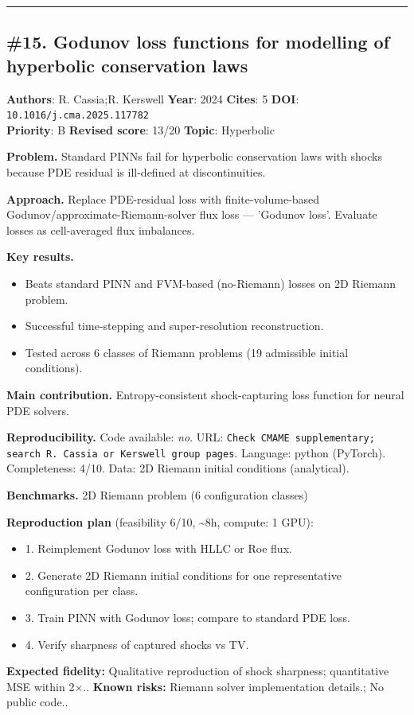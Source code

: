 \documentclass[10pt,letterpaper]{article}
\begin{document}
\medskip\hrule\medskip

\subsection*{\#15. Godunov loss functions for modelling of hyperbolic conservation laws}
\textbf{Authors}: R. Cassia;R. Kerswell \textbullet{} \textbf{Year}: 2024 \textbullet{} \textbf{Cites}: 5 \textbullet{} \textbf{DOI}: \texttt{10.1016/j.cma.2025.117782} \\
\textbf{Priority}: B \textbullet{} \textbf{Revised score}: 13/20 \textbullet{} \textbf{Topic}: Hyperbolic

\textbf{Problem.} Standard PINNs fail for hyperbolic conservation laws with shocks because PDE residual is ill-defined at discontinuities.

\textbf{Approach.} Replace PDE-residual loss with finite-volume-based Godunov/approximate-Riemann-solver flux loss — 'Godunov loss'. Evaluate losses as cell-averaged flux imbalances.

\textbf{Key results.}
\begin{itemize}
\item Beats standard PINN and FVM-based (no-Riemann) losses on 2D Riemann problem.
\item Successful time-stepping and super-resolution reconstruction.
\item Tested across 6 classes of Riemann problems (19 admissible initial conditions).
\end{itemize}

\textbf{Main contribution.} Entropy-consistent shock-capturing loss function for neural PDE solvers.

\textbf{Reproducibility.} Code available: \emph{no}. URL: \texttt{Check CMAME supplementary; search R. Cassia or Kerswell group pages}. Language: python (PyTorch). Completeness: 4/10. Data: 2D Riemann initial conditions (analytical).

\textbf{Benchmarks.} 2D Riemann problem (6 configuration classes)

\textbf{Reproduction plan} (feasibility 6/10, \textasciitilde8h, compute: 1 GPU):
\begin{itemize}
\item 1. Reimplement Godunov loss with HLLC or Roe flux.
\item 2. Generate 2D Riemann initial conditions for one representative configuration per class.
\item 3. Train PINN with Godunov loss; compare to standard PDE loss.
\item 4. Verify sharpness of captured shocks vs TV.
\end{itemize}
\textbf{Expected fidelity:} Qualitative reproduction of shock sharpness; quantitative MSE within 2×.. \textbf{Known risks:} Riemann solver implementation details.; No public code..
\end{document}
